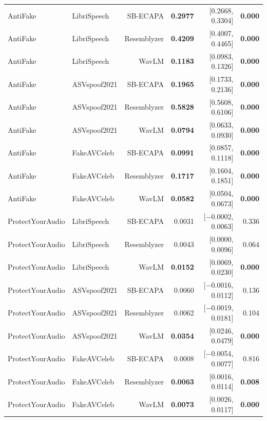 \documentclass[11pt]{article}
\begin{document}
\begin{table}[H]
\begin{tabular}{llrrrr}
\addlinespace
AntiFake & LibriSpeech & SB-ECAPA & \textbf{0.2977} & [0.2668, 0.3304] & \textbf{0.000} \\
AntiFake & LibriSpeech & Resemblyzer & \textbf{0.4209} & [0.4007, 0.4465] & \textbf{0.000} \\
AntiFake & LibriSpeech & WavLM & \textbf{0.1183} & [0.0983, 0.1326] & \textbf{0.000} \\
AntiFake & ASVspoof2021 & SB-ECAPA & \textbf{0.1965} & [0.1733, 0.2136] & \textbf{0.000} \\
AntiFake & ASVspoof2021 & Resemblyzer & \textbf{0.5828} & [0.5608, 0.6106] & \textbf{0.000} \\
AntiFake & ASVspoof2021 & WavLM & \textbf{0.0794} & [0.0633, 0.0930] & \textbf{0.000} \\
AntiFake & FakeAVCeleb & SB-ECAPA & \textbf{0.0991} & [0.0857, 0.1118] & \textbf{0.000} \\
AntiFake & FakeAVCeleb & Resemblyzer & \textbf{0.1717} & [0.1604, 0.1851] & \textbf{0.000} \\
AntiFake & FakeAVCeleb & WavLM & \textbf{0.0582} & [0.0504, 0.0673] & \textbf{0.000} \\
\addlinespace
ProtectYourAudio & LibriSpeech & SB-ECAPA & 0.0031 & [$-$0.0002, 0.0063] & 0.336 \\
ProtectYourAudio & LibriSpeech & Resemblyzer & 0.0043 & [0.0000, 0.0096] & 0.064 \\
ProtectYourAudio & LibriSpeech & WavLM & \textbf{0.0152} & [0.0069, 0.0230] & \textbf{0.000} \\
ProtectYourAudio & ASVspoof2021 & SB-ECAPA & 0.0060 & [$-$0.0016, 0.0112] & 0.136 \\
ProtectYourAudio & ASVspoof2021 & Resemblyzer & 0.0062 & [$-$0.0019, 0.0181] & 0.104 \\
ProtectYourAudio & ASVspoof2021 & WavLM & \textbf{0.0354} & [0.0246, 0.0479] & \textbf{0.000} \\
ProtectYourAudio & FakeAVCeleb & SB-ECAPA & 0.0008 & [$-$0.0054, 0.0077] & 0.816 \\
ProtectYourAudio & FakeAVCeleb & Resemblyzer & \textbf{0.0063} & [0.0016, 0.0114] & \textbf{0.008} \\
ProtectYourAudio & FakeAVCeleb & WavLM & \textbf{0.0073} & [0.0026, 0.0117] & \textbf{0.000} \\
\bottomrule
\end{tabular}
\end{table}
\end{document}
